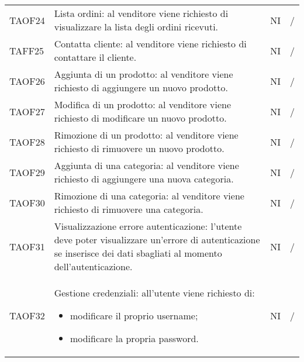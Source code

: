 \begin{center}
\begin{longtable}[!h]{p{60px} p{240px} p{35px} p{35px}}
        TAOF24                           & Lista ordini: al venditore viene richiesto di visualizzare la lista degli ordini ricevuti.                                                                          & NI             & /             \\
        TAFF25                           & Contatta cliente: al venditore viene richiesto di contattare il cliente.                                                                                            & NI             & /             \\
        TAOF26                           & Aggiunta di un prodotto: al venditore viene richiesto di aggiungere un nuovo prodotto.                                                                              & NI             & /             \\
        TAOF27                           & Modifica di un prodotto: al venditore viene richiesto di modificare un nuovo prodotto.                                                                              & NI             & /             \\
        TAOF28                           & Rimozione di un prodotto: al venditore viene richiesto di rimuovere un nuovo prodotto.                                                                              & NI             & /             \\
        TAOF29                           & Aggiunta di una categoria: al venditore viene richiesto di aggiungere una nuova categoria.                                                                          & NI             & /             \\
        TAOF30                           & Rimozione di una categoria: al venditore viene richiesto di rimuovere una categoria.                                                                                & NI             & /             \\
        TAOF31                           & Visualizzazione errore autenticazione: l'utente deve poter visualizzare un'errore di autenticazione se inserisce dei dati sbagliati al momento dell'autenticazione. & NI             & /             \\
        TAOF32                           & Gestione credenziali: all'utente viene richiesto di: \begin{itemize} \item modificare il proprio username; \item modificare la propria password.\end{itemize}                                                                                     & NI             & /             \\
    \end{longtable}
\end{center}